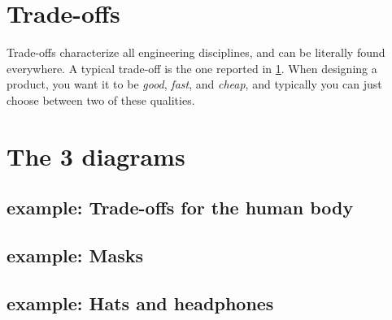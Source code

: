 \section{Trade-offs}

Trade-offs characterize all engineering disciplines, and can be literally found everywhere. A typical trade-off is the one reported in \cref{fig:fast_good_cheap}. When designing a product, you want it to be \emph{good}, \emph{fast}, and \emph{cheap}, and typically you can just choose between two of these qualities.

\begin{figure}[h!]
  \begin{center}
  \end{center}
  \caption{}
  \label{fig:fast_good_cheap}
\end{figure}


\section{The 3 diagrams}


\devel{} %


\subsection{example: Trade-offs for the human body}

\devel{} %

\subsection{example: Masks}

\devel{ }%


\subsection{example: Hats and headphones}

\devel{} %
